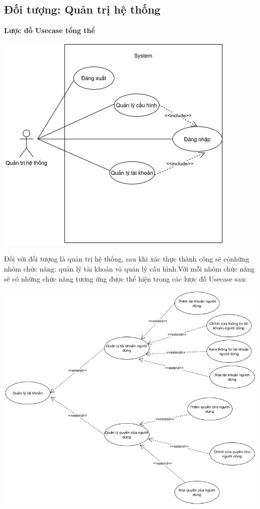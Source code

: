 \subsection{Đối tượng: Quản trị hệ thống}
\textbf{Lược đồ Usecase tổng thể}
\begin{center}
  \captionsetup{type=figure}
  \includegraphics[scale=0.8]{img/UML/Admin/adminUsecase.png}
\end{center}

\indent Đối với đối tượng là quản trị hệ thống, sau khi xác thực thành công sẽ cónhững nhóm chức năng: quản lý tài khoản và quản lý cấu hình.Với mỗi nhóm chức năng sẽ có những chức năng tương ứng được thể hiện trong các lược đồ Usecase sau:

\begin{center}
  \captionsetup{type=figure}
  \includegraphics[scale=0.5]{img/UML/Admin/quanlytaikhoan.png}
\end{center}

